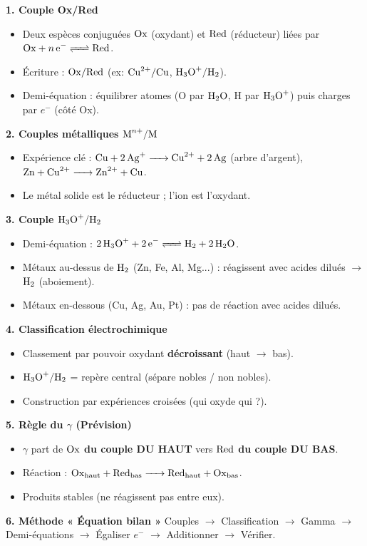 \documentclass[11pt]{article}
\begin{document}
\begin{aretenir}
\textbf{1. Couple Ox/Red}
\begin{itemize}
  \item Deux espèces conjuguées $\ce{Ox}$ (oxydant) et $\ce{Red}$ (réducteur) liées par $\ce{Ox + n e- <=> Red}$.
  \item Écriture : $\ce{Ox/Red}$ (ex: $\ce{Cu^2+}/\ce{Cu}$, $\ce{H3O+}/\ce{H2}$).
  \item Demi-équation : équilibrer atomes (O par $\ce{H2O}$, H par $\ce{H3O+}$) puis charges par $e^-$ (côté Ox).
\end{itemize}

\textbf{2. Couples métalliques $\ce{M^{n+}}/\ce{M}$}
\begin{itemize}
  \item Expérience clé : $\ce{Cu + 2Ag+ -> Cu^2+ + 2Ag}$ (arbre d'argent), $\ce{Zn + Cu^2+ -> Zn^2+ + Cu}$.
  \item Le métal solide est le réducteur ; l'ion est l'oxydant.
\end{itemize}

\textbf{3. Couple $\ce{H3O+}/\ce{H2}$}
\begin{itemize}
  \item Demi-équation : $\ce{2H3O+ + 2e- <=> H2 + 2H2O}$.
  \item Métaux au-dessus de $\ce{H2}$ (Zn, Fe, Al, Mg...) : réagissent avec acides dilués $\to$ $\ce{H2}$ (aboiement).
  \item Métaux en-dessous (Cu, Ag, Au, Pt) : pas de réaction avec acides dilués.
\end{itemize}

\textbf{4. Classification électrochimique}
\begin{itemize}
  \item Classement par pouvoir oxydant \textbf{décroissant} (haut $\to$ bas).
  \item $\ce{H3O+}/\ce{H2}$ = repère central (sépare nobles / non nobles).
  \item Construction par expériences croisées (qui oxyde qui ?).
\end{itemize}

\textbf{5. Règle du $\gamma$ (Prévision)}
\begin{itemize}
  \item $\gamma$ part de \textbf{$\ce{Ox}$ du couple DU HAUT} vers \textbf{$\ce{Red}$ du couple DU BAS}.
  \item Réaction : $\ce{Ox_{haut} + Red_{bas} -> Red_{haut} + Ox_{bas}}$.
  \item Produits stables (ne réagissent pas entre eux).
\end{itemize}

\textbf{6. Méthode « Équation bilan »}
Couples $\to$ Classification $\to$ Gamma $\to$ Demi-équations $\to$ Égaliser $e^-$ $\to$ Additionner $\to$ Vérifier.
\end{aretenir}
\end{document}
